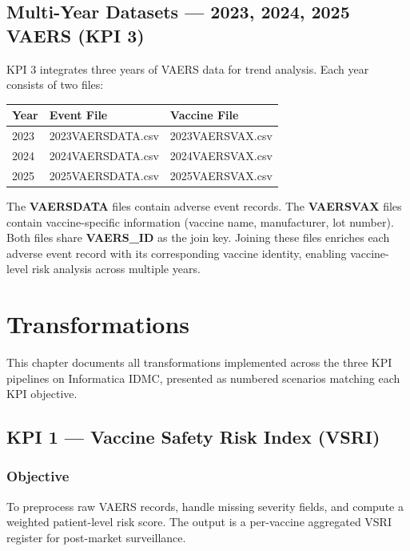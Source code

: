 \documentclass[12pt,a4paper]{report}
\begin{document}
\section{Multi-Year Datasets — 2023, 2024, 2025 VAERS (KPI 3)}

KPI 3 integrates three years of VAERS data for trend analysis. Each year consists of two files:

\medskip
\begin{tabular}{lll}
\toprule
\textbf{Year} & \textbf{Event File} & \textbf{Vaccine File} \\
\midrule
2023 & 2023VAERSDATA.csv & 2023VAERSVAX.csv \\
2024 & 2024VAERSDATA.csv & 2024VAERSVAX.csv \\
2025 & 2025VAERSDATA.csv & 2025VAERSVAX.csv \\
\bottomrule
\end{tabular}

\medskip\noindent The \textbf{VAERSDATA} files contain adverse event records. The \textbf{VAERSVAX} files contain vaccine-specific information (vaccine name, manufacturer, lot number). Both files share \textbf{VAERS\_ID} as the join key. Joining these files enriches each adverse event record with its corresponding vaccine identity, enabling vaccine-level risk analysis across multiple years.

\chapter{Transformations}

This chapter documents all transformations implemented across the three KPI pipelines on Informatica IDMC, presented as numbered scenarios matching each KPI objective.

\section*{KPI 1 — Vaccine Safety Risk Index (VSRI)}

\subsection*{Objective}
To preprocess raw VAERS records, handle missing severity fields, and compute a weighted patient-level risk score. The output is a per-vaccine aggregated VSRI register for post-market surveillance.
\end{document}
